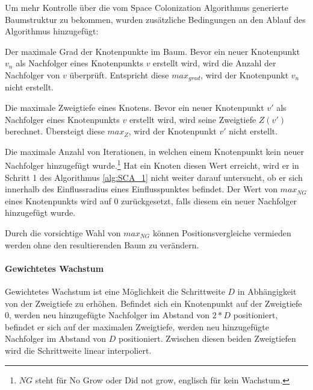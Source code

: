 Um mehr Kontrolle über die vom Space Colonization Algorithmus generierte Baumstruktur zu bekommen, wurden zusätzliche Bedingungen an den Ablauf des Algorithmus hinzugefügt:
\begin{description}[labelindent]
	\item[\boldmath$max_{grad}$] Der maximale Grad der Knotenpunkte im Baum. Bevor ein neuer Knotenpunkt $v_n$ als Nachfolger eines Knotenpunkts $v$ erstellt wird, wird die Anzahl der Nachfolger von $v$ überprüft. Entspricht diese $max_{grad}$, wird der Knotenpunkt $v_n$ nicht erstellt.\\
	
	\item[\boldmath$max_{Z}$] Die maximale Zweigtiefe eines Knotens. Bevor ein neuer Knotenpunkt $v'$ als Nachfolger eines Knotenpunkts $v$ erstellt wird, wird seine Zweigtiefe $Z(v')$ berechnet. Übersteigt diese $max_{Z}$, wird der Knotenpunkt $v'$ nicht erstellt.\\
	
	\item[\boldmath$max_{NG}$] Die maximale Anzahl von Iterationen, in welchen einem Knotenpunkt kein neuer Nachfolger hinzugefügt wurde.\footnote{$NG$ steht für \glqq No Grow\grqq{} oder \glqq Did not grow\grqq, englisch für \glqq kein Wachstum\grqq.} Hat ein Knoten diesen Wert erreicht, wird er in Schritt 1 des Algorithmus \ref{alg:SCA_1} nicht weiter darauf untersucht, ob er sich innerhalb des Einflussradius eines Einflusspunktes befindet. Der Wert von $max_{NG}$ eines Knotenpunkts wird auf $0$ zurückgesetzt, falls diesem ein neuer Nachfolger hinzugefügt wurde.
	
	Durch die vorsichtige Wahl von $max_{NG}$ können Positionsvergleiche vermieden werden ohne den resultierenden Baum zu verändern.
\end{description}

\paragraph{Gewichtetes Wachstum}

Gewichtetes Wachstum ist eine Möglichkeit die Schrittweite $D$ in Abhängigkeit von der Zweigtiefe zu erhöhen. Befindet sich ein Knotenpunkt auf der Zweigtiefe $0$, werden neu hinzugefügte Nachfolger im Abstand von $2 * D$ positioniert, befindet er sich auf der maximalen Zweigtiefe, werden neu hinzugefügte Nachfolger im Abstand von $D$ positioniert. Zwischen diesen beiden Zweigtiefen wird die Schrittweite linear interpoliert.

